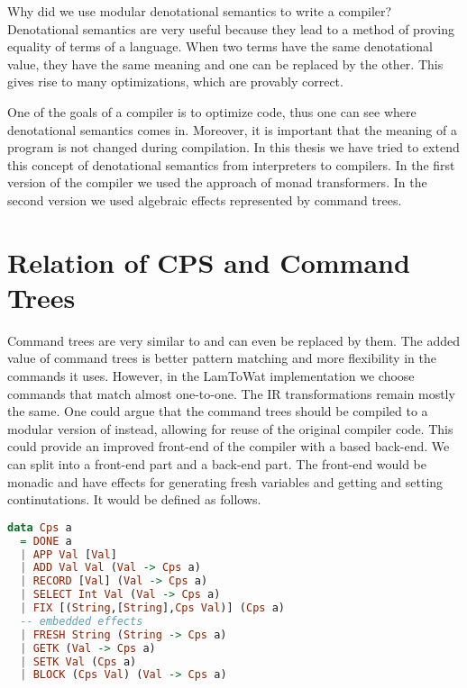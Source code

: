 Why did we use modular denotational semantics to write a compiler? Denotational semantics are very useful because they lead to a method of proving equality of terms of a language. When two terms have the same denotational value, they have the same meaning and one can be replaced by the other. This gives rise to many optimizations, which are provably correct.

One of the goals of a compiler is to optimize code, thus one can see where denotational semantics comes in. Moreover, it is important that the meaning of a program is not changed during compilation. In this thesis we have tried to extend this concept of denotational semantics from interpreters to compilers. In the first version of the compiler we used the approach of monad transformers. In the second version we used algebraic effects represented by command trees.

\section{Relation of CPS and Command Trees}
Command trees are very similar to  and can even be replaced by them. The added value of command trees is better pattern matching and more flexibility in the commands it uses. However, in the LamToWat implementation we choose commands that match  almost one-to-one. The IR transformations remain mostly the same. One could argue that the command trees should be compiled to a modular version of  instead, allowing for reuse of the original compiler code. This could provide an improved front-end of the compiler with a  based back-end. We can split  into a front-end part and a back-end part. The front-end would be monadic and have effects for generating fresh variables and getting and setting continutations. It would be defined as follows.

\begin{lstlisting}[language=Haskell]
data Cps a
  = DONE a
  | APP Val [Val]
  | ADD Val Val (Val -> Cps a)
  | RECORD [Val] (Val -> Cps a)
  | SELECT Int Val (Val -> Cps a)
  | FIX [(String,[String],Cps Val)] (Cps a)
  -- embedded effects
  | FRESH String (String -> Cps a)
  | GETK (Val -> Cps a)
  | SETK Val (Cps a)
  | BLOCK (Cps Val) (Val -> Cps a)
\end{lstlisting}

